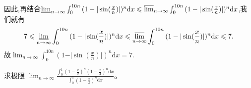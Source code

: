 \documentclass[../../main.tex]{subfiles}
\begin{document}
\begin{solution}
因此,再结合\(\varliminf_{n\rightarrow\infty}\int_0^{10n}{(1-\vert\sin(\frac{x}{n})\vert)^n}\mathrm{d}x\leqslant\varlimsup_{n\rightarrow\infty}\int_0^{10n}{(1-\vert\sin(\frac{x}{n})\vert)^n}\mathrm{d}x\),我们就有
\[
7\leqslant\varliminf_{n\rightarrow\infty}\int_0^{10n}{(1-\vert\sin(\frac{x}{n})\vert)^n}\mathrm{d}x\leqslant\varlimsup_{n\rightarrow\infty}\int_0^{10n}{(1-\vert\sin(\frac{x}{n})\vert)^n}\mathrm{d}x\leqslant 7.
\]
故\(\lim_{n\rightarrow\infty}\int_0^{10n}{(1-\vert\sin(\frac{x}{n})\vert)^n}\mathrm{d}x = 7\).
\end{solution}

\begin{example}
求极限 $\lim_{n\rightarrow \infty} \frac{\int_0^1{\left( 1-\frac{x}{2} \right) ^n\left( 1-\frac{x}{4} \right) ^n\mathrm{d}x}}{\int_0^1{\left( 1-\frac{x}{2} \right) ^n\mathrm{d}x}}$。
\end{example}
\end{document}
